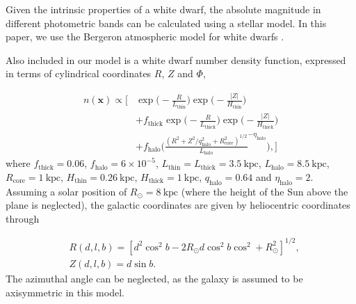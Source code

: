 \documentclass[fleqn,usenatbib]{mnras}
\newcommand{\kpc}{\text{kpc}}
\begin{document}
Given the intrinsic properties of a white dwarf, the absolute magnitude in different photometric bands can be calculated using a stellar model. In this paper, we use the Bergeron atmospheric model for white dwarfs \citep{Bergeron:1995we,Finley:1997zz,Bergeron:2000ce,2001PASP..113..409F}.

Also included in our model is a white dwarf number density function, expressed in terms of cylindrical coordinates $R$, $Z$ and $\Phi$,

\begin{equation}\label{eq:numberdensity}
\begin{split}
	n(\mathbf{x}) \propto
	\Bigg[ 
		& \exp\Bigg(-\frac{R}{L_\text{thin}}\Bigg)\exp\Bigg(-\frac{|Z|}{H_\text{thin}}\Bigg) \\
		& +f_\text{thick}\exp\Bigg(-\frac{R}{L_\text{thick}}\Bigg)\exp\Bigg(-\frac{|Z|}{H_\text{thick}}\Bigg) \\
		& +f_\text{halo}\Bigg( \frac{(R^2+Z^2/q_\text{halo}^2+R_\text{core}^2)^{1/2}}{L_\text{halo}}^{-\eta_\text{halo}} \Bigg),
	\Bigg]
\end{split}
\end{equation}
where $f_\text{thick}=0.06$, $f_\text{halo}=6\times10^{-5}$, $L_\text{thin}=L_\text{thick}=3.5~\kpc$, $L_\text{halo}=8.5~\kpc$, $R_\text{core}=1~\kpc$, $H_\text{thin}=0.26~\kpc$, $H_\text{thick}=1~\kpc$, $q_\text{halo}=0.64$ and $\eta_\text{halo} = 2$. Assuming a solar position of $R_\odot=8~\kpc$ (where the height of the Sun above the plane is neglected), the galactic coordinates are given by heliocentric coordinates through

\begin{equation}
\begin{split}
	& R(d,l,b) = [d^2\cos^2b-2 R_\odot d \cos^2b\cos^2+R_\odot^2]^{1/2}, \\
	& Z(d,l,b) = d \sin b.
\end{split}
\end{equation}
The azimuthal angle can be neglected, as the galaxy is assumed to be axisymmetric in this model.
\end{document}
